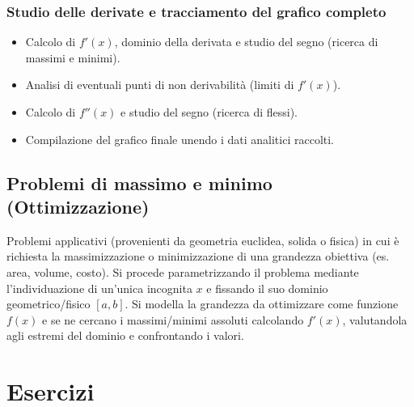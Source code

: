 \subsubsection{Studio delle derivate e tracciamento del grafico completo}
\begin{itemize}
    \item Calcolo di $f'(x)$, dominio della derivata e studio del segno (ricerca di massimi e minimi).
    \item Analisi di eventuali punti di non derivabilità (limiti di $f'(x)$).
    \item Calcolo di $f''(x)$ e studio del segno (ricerca di flessi).
    \item Compilazione del grafico finale unendo i dati analitici raccolti.
\end{itemize}

\subsection{Problemi di massimo e minimo (Ottimizzazione)}
Problemi applicativi (provenienti da geometria euclidea, solida o fisica) in cui è richiesta la massimizzazione o minimizzazione di una grandezza obiettiva (es. area, volume, costo).
Si procede parametrizzando il problema mediante l'individuazione di un'unica incognita $x$ e fissando il suo dominio geometrico/fisico $[a, b]$. Si modella la grandezza da ottimizzare come funzione $f(x)$ e se ne cercano i massimi/minimi assoluti calcolando $f'(x)$, valutandola agli estremi del dominio e confrontando i valori.

\section{Esercizi}

